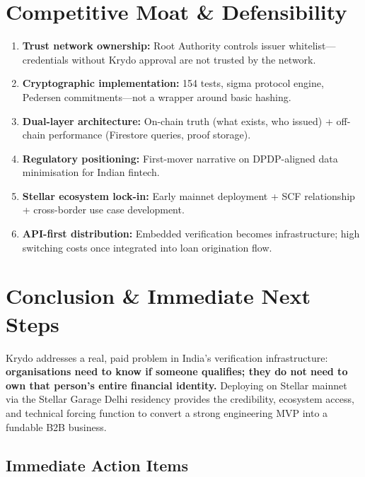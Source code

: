 \documentclass[11pt,a4paper]{article}
\newcommand{\krydo}{\textsf{Krydo}}
\newcommand{\stellar}{\textsf{Stellar}}
\begin{document}
\section{Competitive Moat \& Defensibility}

\begin{enumerate}
  \item \textbf{Trust network ownership:} Root Authority controls issuer whitelist---credentials without \krydo{} approval are not trusted by the network.
  \item \textbf{Cryptographic implementation:} 154 tests, sigma protocol engine, Pedersen commitments---not a wrapper around basic hashing.
  \item \textbf{Dual-layer architecture:} On-chain truth (what exists, who issued) + off-chain performance (Firestore queries, proof storage).
  \item \textbf{Regulatory positioning:} First-mover narrative on DPDP-aligned data minimisation for Indian fintech.
  \item \textbf{\stellar{} ecosystem lock-in:} Early mainnet deployment + SCF relationship + cross-border use case development.
  \item \textbf{API-first distribution:} Embedded verification becomes infrastructure; high switching costs once integrated into loan origination flow.
\end{enumerate}

\section{Conclusion \& Immediate Next Steps}

\krydo{} addresses a real, paid problem in India's verification infrastructure: \textbf{organisations need to know if someone qualifies; they do not need to own that person's entire financial identity.} Deploying on \stellar{} mainnet via the Stellar Garage Delhi residency provides the credibility, ecosystem access, and technical forcing function to convert a strong engineering MVP into a fundable B2B business.

\subsection{Immediate Action Items}
\end{document}
